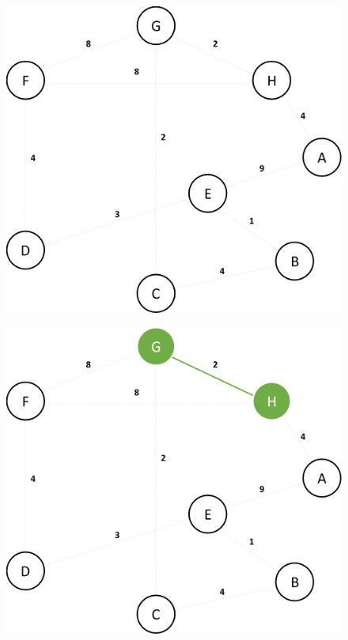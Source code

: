 \documentclass{article}
\begin{document}
\begin{figure}[H]
\centering
\includegraphics[scale=0.6]{images/Q2/01.png}
\end{figure}

\begin{figure}[H]
\centering
\includegraphics[scale=0.6]{images/Q2/02.png}
\end{figure}
\end{document}
